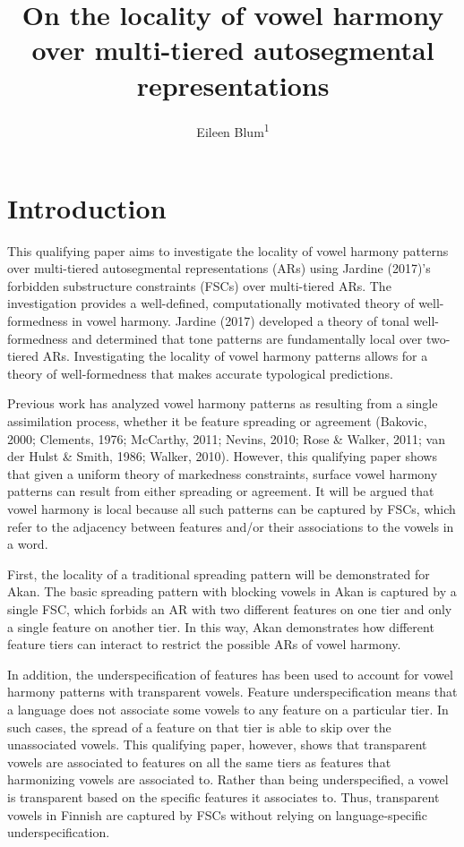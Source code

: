 \documentclass[,doc,floatsintext]{apa6}
\title{On the locality of vowel harmony over multi-tiered autosegmental
representations}
\author{Eileen Blum\textsuperscript{1}}
\date{}
\affiliation{
\vspace{0.5cm}
\textsuperscript{1} Rutgers University}
\theoremstyle{definition}
\theoremstyle{definition}
\theoremstyle{definition}
\theoremstyle{remark}
\begin{document}
\maketitle

\section{Introduction}\label{introduction}

This qualifying paper aims to investigate the locality of vowel harmony
patterns over multi-tiered autosegmental representations (ARs) using
Jardine (2017)'s forbidden substructure constraints (FSCs) over
multi-tiered ARs. The investigation provides a well-defined,
computationally motivated theory of well-formedness in vowel harmony.
Jardine (2017) developed a theory of tonal well-formedness and
determined that tone patterns are fundamentally local over two-tiered
ARs. Investigating the locality of vowel harmony patterns allows for a
theory of well-formedness that makes accurate typological predictions.

Previous work has analyzed vowel harmony patterns as resulting from a
single assimilation process, whether it be feature spreading or
agreement (Bakovic, 2000; Clements, 1976; McCarthy, 2011; Nevins, 2010;
Rose \& Walker, 2011; van der Hulst \& Smith, 1986; Walker, 2010).
However, this qualifying paper shows that given a uniform theory of
markedness constraints, surface vowel harmony patterns can result from
either spreading or agreement. It will be argued that vowel harmony is
local because all such patterns can be captured by FSCs, which refer to
the adjacency between features and/or their associations to the vowels
in a word.

First, the locality of a traditional spreading pattern will be
demonstrated for Akan. The basic spreading pattern with blocking vowels
in Akan is captured by a single FSC, which forbids an AR with two
different features on one tier and only a single feature on another
tier. In this way, Akan demonstrates how different feature tiers can
interact to restrict the possible ARs of vowel harmony.

In addition, the underspecification of features has been used to account
for vowel harmony patterns with transparent vowels. Feature
underspecification means that a language does not associate some vowels
to any feature on a particular tier. In such cases, the spread of a
feature on that tier is able to skip over the unassociated vowels. This
qualifying paper, however, shows that transparent vowels are associated
to features on all the same tiers as features that harmonizing vowels
are associated to. Rather than being underspecified, a vowel is
transparent based on the specific features it associates to. Thus,
transparent vowels in Finnish are captured by FSCs without relying on
language-specific underspecification.
\end{document}
